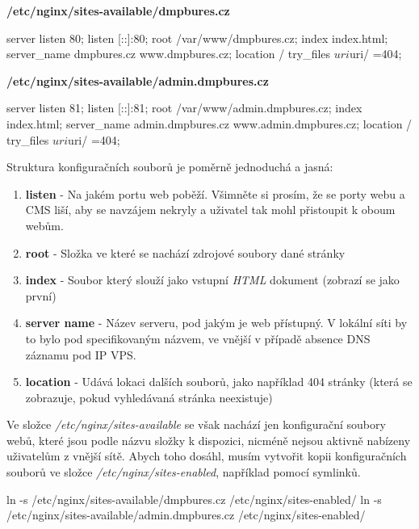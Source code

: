 \documentclass[12pt,a4paper]{report}
\begin{document}
  \noindent\textbf{/etc/nginx/sites-available/dmpbures.cz}
  \begin{bash}
  server {
    listen 80;
    listen [::]:80;
    root /var/www/dmpbures.cz;
    index index.html;
    server_name dmpbures.cz www.dmpbures.cz;
    location / {
      try_files $uri $uri/ =404;
    }
  }
  \end{bash}

  \noindent\textbf{/etc/nginx/sites-available/admin.dmpbures.cz}
  \begin{bash}
  server {
    listen 81;
    listen [::]:81;
    root /var/www/admin.dmpbures.cz;
    index index.html;
    server_name admin.dmpbures.cz www.admin.dmpbures.cz;
    location / {
      try_files $uri $uri/ =404;
    }
  }
  \end{bash}
  
  Struktura konfiguračních souborů je poměrně jednoduchá a jasná: 
  \begin{enumerate}
    \item \textbf{listen} - Na jakém portu web poběží. Všimněte si prosím, že se porty webu a CMS liší, aby se navzájem nekryly a uživatel tak mohl přistoupit k oboum webům.
    \item \textbf{root} - Složka ve které se nachází zdrojové soubory dané stránky
    \item \textbf{index} - Soubor který slouží jako vstupní \emph{HTML} dokument (zobrazí se jako první)
    \item \textbf{server name} - Název serveru, pod jakým je web přístupný. V lokální síti by to bylo pod specifikovaným názvem, ve vnější v případě absence DNS záznamu pod IP VPS.
    \item \textbf{location} - Udává lokaci dalších souborů, jako například 404 stránky (která se zobrazuje, pokud vyhledávaná stránka neexistuje)
  \end{enumerate}

  Ve složce \emph{/etc/nginx/sites-available} se však nachází jen konfigurační soubory webů,
  které jsou podle názvu složky k dispozici, nicméně nejsou aktivně nabízeny uživatelům z vnější sítě. 
  Abych toho dosáhl, musím vytvořit kopii konfiguračních souborů ve složce \emph{/etc/nginx/sites-enabled}, například pomocí symlinků.

  \begin{bash}
    ln -s /etc/nginx/sites-available/dmpbures.cz 
    /etc/nginx/sites-enabled/
    ln -s /etc/nginx/sites-available/admin.dmpbures.cz
     /etc/nginx/sites-enabled/
  \end{bash}
\end{document}
